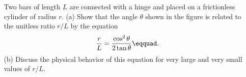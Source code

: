 Two bars of length $L$ are connected with a hinge and
placed on a frictionless cylinder of radius $r$. (a) Show
that the angle $\theta $ shown in the figure is related to
the unitless ratio $r/L$ by the equation
\begin{equation*}
 \frac{r}{L} = \frac{\cos^2\theta}{2\tan\theta}\eqquad.
\end{equation*}\hwendpart
(b) Discuss the physical behavior of this equation for very
large and very small values of $r/L$.
